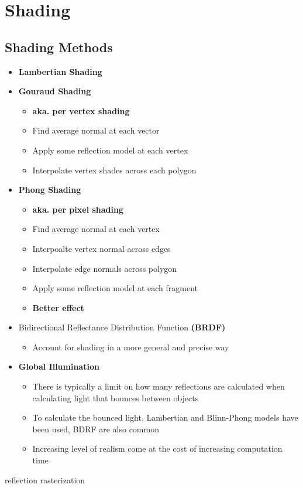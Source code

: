 \chapter{Shading}

\section{Shading Methods}

  \begin{itemize}
    \item \textbf{Lambertian Shading}
    \item \textbf{Gouraud Shading}
    \begin{itemize}
      \item \textbf{aka. per vertex shading}
      \item Find average normal at each vector
      \item Apply some reflection model at each vertex
      \item Interpolate vertex shades across each polygon
    \end{itemize}

    \item \textbf{Phong Shading}
    \begin{itemize}
      \item \textbf{aka. per pixel shading}
      \item Find average normal at each vertex
      \item Interpoalte vertex normal across edges
      \item Interpolate edge normals across polygon
      \item Apply some reflection model at each fragment
      \item \textbf{Better effect}
    \end{itemize}

    \item Bidirectional Reflectance Distribution Function \textbf{(BRDF)}
    \begin{itemize}
      \item Account for shading in a more general and precise way
    \end{itemize}

    \item \textbf{Global Illumination}
    \begin{itemize}
      \item There is typically a limit on how many reflections are calculated
      when calculating light that bounces between objects
      \item To calculate the bounced light, Lambertian and Blinn-Phong models
      have been used, BDRF are also common
      \item Increasing level of realism come at the cost of increasing
      computation time
    \end{itemize}
  \end{itemize}

{reflection}
{rasterization}
